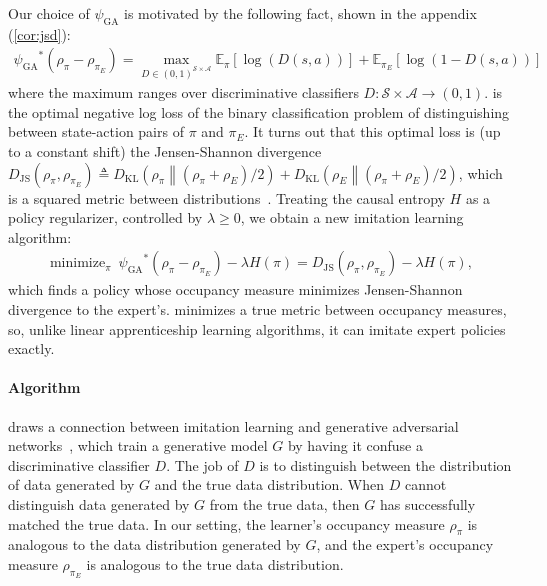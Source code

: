 \documentclass{article}
\newcommand\bbE{\ensuremath{\mathbb{E}}} %
\newcommand\psiga{\ensuremath{\psi_\text{GA}}}
\DeclareMathOperator*{\minimize}{minimize}
\newcommand{\1}{\mathbb{I}} %
\DeclareMathOperator{\rl}{RL}
\DeclareMathOperator{\irl}{IRL} %
\newcommand{\todo}[1]{{\color{red} [TODO: {#1}]}}
\begin{document}
Our choice of $\psiga$ is motivated by the following fact, shown in the appendix (\cref{cor:jsd}):
\begin{align}
\psiga^*(\rho_\pi - \rho_{\pi_E}) = \max_{D \in (0,1)^{\mathcal{S} \times \mathcal{A}}} \bbE_{\pi}[\log(D(s,a))] + \bbE_{\pi_E}[\log(1-D(s,a))] \label{eq:galoss}
\end{align}
where the maximum ranges over discriminative classifiers $D : \mathcal{S} \times \mathcal{A} \rightarrow (0,1)$.  is the optimal negative log loss of the binary classification problem of distinguishing between state-action pairs of $\pi$ and $\pi_E$.
It turns out that this optimal loss is (up to a constant shift) the Jensen-Shannon divergence
$D_{\text{JS}}(\rho_\pi, \rho_{\pi_E}) \triangleq D_{\text{KL}}\left(\rho_\pi \middle\| (\rho_\pi+\rho_E)/2\right) + D_{\text{KL}}\left(\rho_E \middle\| (\rho_\pi+\rho_E)/2\right)$,
which is a squared metric between distributions~\citep{goodfellow2014generative,nguyen2009surrogate}.
Treating the causal entropy $H$ as a policy regularizer, controlled by $\lambda \geq 0$, we obtain a new imitation learning algorithm:
\begin{align}
\minimize_\pi \ \psiga^*(\rho_\pi - \rho_{\pi_E}) - \lambda H(\pi) = D_{\text{JS}}(\rho_\pi, \rho_{\pi_E}) - \lambda H(\pi), \label{eq:gail}
\end{align}
which finds a policy whose occupancy measure minimizes Jensen-Shannon divergence to the expert's.
 minimizes a true metric between occupancy measures, so, unlike linear apprenticeship learning algorithms, it can imitate expert policies exactly.



\paragraph{Algorithm}
 draws a connection between imitation learning and generative adversarial networks~\citep{goodfellow2014generative}, which train a generative model $G$ by having it confuse a discriminative classifier $D$.
The job of $D$ is to distinguish between the distribution of data generated by $G$ and the true data distribution.
When $D$ cannot distinguish data generated by $G$ from the true data, then $G$ has successfully matched the true data.
In our setting, the learner's occupancy measure $\rho_\pi$ is analogous to the data distribution generated by $G$, and the expert's occupancy measure $\rho_{\pi_E}$ is analogous to the true data distribution.
\end{document}
